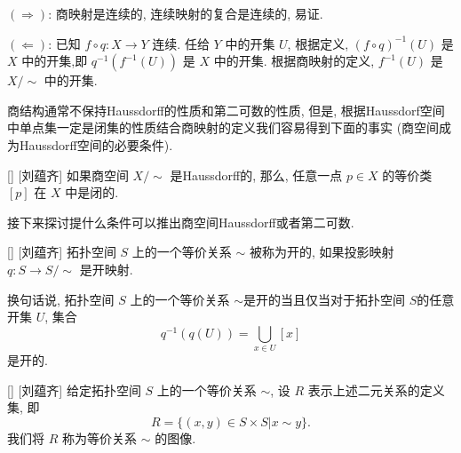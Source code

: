 \documentclass[UTF8]{ctexart}
\begin{document}
        \begin{prf}
             \((\Rightarrow)\): 商映射是连续的, 连续映射的复合是连续的, 易证. 

             \((\Leftarrow)\): 已知 \(f \circ q: X \to Y\) 连续. 任给 \(Y\) 中的开集 \(U\), 根据定义, \({(f \circ q)}^{-1}(U)\) 是 \(X\) 中的开集,即 \(q^{-1}(f^{-1}(U))\) 是 \(X\) 中的开集. 根据商映射的定义,  \(f^{-1}(U)\) 是 \(X/\sim\) 中的开集. 
        \end{prf}

        \vspace{10pt}
        
        商结构通常不保持Haussdorff的性质和第二可数的性质, 但是, 根据Haussdorf空间中单点集一定是闭集的性质结合商映射的定义我们容易得到下面的事实 (商空间成为Haussdorff空间的必要条件). 

        \begin{ppt}
            []
            {}
            []
            [刘蕴齐]
            如果商空间 \(X / \sim\) 是Haussdorff的, 那么, 任意一点 \(p \in X\) 的等价类 \([p]\) 在 \(X\) 中是闭的. 
        \end{ppt}

        \vspace{10pt}
        
        接下来探讨提什么条件可以推出商空间Haussdorff或者第二可数. 

        \begin{dfn}
            []
            {}
            []
            [刘蕴齐]
            拓扑空间 \( S \) 上的一个等价关系 \( \sim \) 被称为开的, 如果投影映射 \( q: S \to S/\sim \) 是开映射. 
        \end{dfn}

        \begin{rmk}
            []
            换句话说, 拓扑空间 \( S \) 上的一个等价关系 \( \sim \)是开的当且仅当对于拓扑空间 \( S \)的任意开集 \(U\), 集合
            \[
                q^{-1}(q(U)) = \bigcup_{x \in U} [x]
            \]
            是开的. 
        \end{rmk}

        \begin{dfn}
            []
            {}
            []
            [刘蕴齐]
            给定拓扑空间 \( S \) 上的一个等价关系 \( \sim \), 设 \(R\) 表示上述二元关系的定义集, 即
            \[
                R = \{(x,y) \in S \times S | x \sim y\}.
            \]
            我们将 \(R\) 称为等价关系 \(\sim\) 的图像. 
        \end{dfn}
\end{document}
